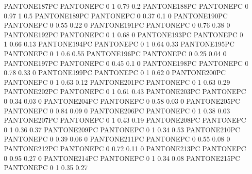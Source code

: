  {PANTONE187PC} {PANTONE\SpotSpace PC} {0 1 0.79 0.2}
 {PANTONE188PC} {PANTONE\SpotSpace PC} {0 0.97 1 0.5}
 {PANTONE189PC} {PANTONE\SpotSpace PC} {0 0.37 0.1 0}
 {PANTONE190PC} {PANTONE\SpotSpace PC} {0 0.55 0.22 0}
 {PANTONE191PC} {PANTONE\SpotSpace PC} {0 0.76 0.38 0}
 {PANTONE192PC} {PANTONE\SpotSpace PC} {0 1 0.68 0}
 {PANTONE193PC} {PANTONE\SpotSpace PC} {0 1 0.66 0.13}
 {PANTONE194PC} {PANTONE\SpotSpace PC} {0 1 0.64 0.33}
 {PANTONE195PC} {PANTONE\SpotSpace PC} {0 1 0.6 0.55}
 {PANTONE196PC} {PANTONE\SpotSpace PC} {0 0.25 0.04 0}
 {PANTONE197PC} {PANTONE\SpotSpace PC} {0 0.45 0.1 0}
 {PANTONE198PC} {PANTONE\SpotSpace PC} {0 0.78 0.33 0}
 {PANTONE199PC} {PANTONE\SpotSpace PC} {0 1 0.62 0}
 {PANTONE200PC} {PANTONE\SpotSpace PC} {0 1 0.63 0.12}
 {PANTONE201PC} {PANTONE\SpotSpace PC} {0 1 0.63 0.29}
 {PANTONE202PC} {PANTONE\SpotSpace PC} {0 1 0.61 0.43}
 {PANTONE203PC} {PANTONE\SpotSpace PC} {0 0.34 0.03 0}
 {PANTONE204PC} {PANTONE\SpotSpace PC} {0 0.58 0.03 0}
 {PANTONE205PC} {PANTONE\SpotSpace PC} {0 0.84 0.09 0}
 {PANTONE206PC} {PANTONE\SpotSpace PC} {0 1 0.38 0.03}
 {PANTONE207PC} {PANTONE\SpotSpace PC} {0 1 0.43 0.19}
 {PANTONE208PC} {PANTONE\SpotSpace PC} {0 1 0.36 0.37}
 {PANTONE209PC} {PANTONE\SpotSpace PC} {0 1 0.34 0.53}
 {PANTONE210PC} {PANTONE\SpotSpace PC} {0 0.39 0.06 0}
 {PANTONE211PC} {PANTONE\SpotSpace PC} {0 0.55 0.08 0}
 {PANTONE212PC} {PANTONE\SpotSpace PC} {0 0.72 0.11 0}
 {PANTONE213PC} {PANTONE\SpotSpace PC} {0 0.95 0.27 0}
 {PANTONE214PC} {PANTONE\SpotSpace PC} {0 1 0.34 0.08}
 {PANTONE215PC} {PANTONE\SpotSpace PC} {0 1 0.35 0.27}
